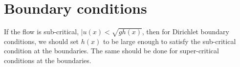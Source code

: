 
\section{Boundary conditions} %
\label{sec:boundary_conditions}
If the flow is sub-critical, $|u(x)<\sqrt{gh(x)}$, then for Dirichlet boundary conditions, we should set $h(x)$ to be large enough to satisfy the sub-critical condition at the boundaries.  The same should be done for super-critical conditions at the boundaries.
